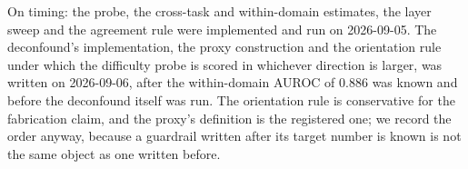 On timing: the probe, the cross-task and within-domain estimates, the layer
sweep and the agreement rule were implemented and run on 2026-09-05. The
deconfound's implementation, the proxy construction and the orientation rule
under which the difficulty probe is scored in whichever direction is larger,
was written on 2026-09-06, after the within-domain AUROC of $0.886$ was known
and before the deconfound itself was run. The orientation rule is conservative
for the fabrication claim, and the proxy's definition is the registered one; we
record the order anyway, because a guardrail written after its target number is
known is not the same object as one written before.
